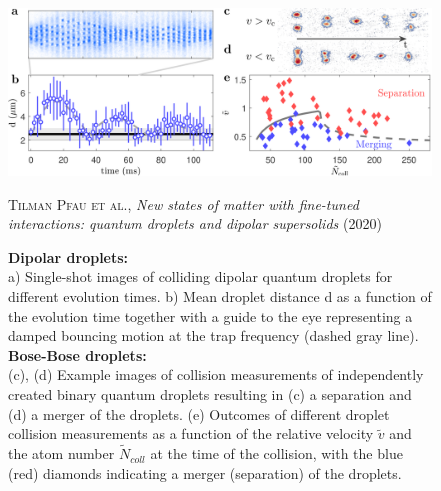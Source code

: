 \begin{figure}[H]
    \centering
    \includegraphics[width=1.0\textwidth]{IMAGE/droplet_collision.png}\\
    \caption{
            \textbf{Dipolar droplets:} \\
            a) Single-shot images of colliding dipolar quantum droplets for different evolution times. b) Mean droplet distance d as a function of the evolution time together with a guide to the eye representing a damped bouncing motion at the trap frequency (dashed gray line). \\
            \textbf{Bose-Bose droplets:} \\
            (c), (d) Example images of collision measurements of independently created binary quantum droplets resulting in (c) a separation and (d) a merger of the droplets. (e) Outcomes of different droplet collision measurements as a function of the relative velocity $\tilde{v}$ and the atom number $\tilde{N}_{coll}$ at the time of the collision, with the blue (red) diamonds indicating a merger (separation) of the droplets.
      }
    \textsc{Tilman Pfau et al.}, \emph{New states of matter with fine-tuned interactions: quantum droplets and dipolar supersolids} (2020)
    \label{fig:droplet_collision}
\end{figure}


